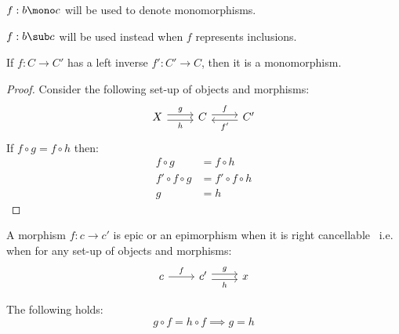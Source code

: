 \begin{remark}
  $f:b\mono c$ will be used to denote monomorphisms.
\end{remark}

\begin{remark}
  $f:b\sub c$ will be used instead when $f$ represents inclusions.
\end{remark}

\begin{theorem}\label{thm:left_inverse_implies_mono}

  If $f:C\to C'$ has a left inverse $f':C'\to C$, then it is a monomorphism.

  \begin{proof}
    Consider the following set-up of objects and morphisms:
    \[
      \begin{tikzcd}[ampersand replacement=\&]
        X \& C \& {C'}
        \arrow["f", shift left=1, from=1-2, to=1-3]
        \arrow["g", shift left=1, from=1-1, to=1-2]
        \arrow["h"', shift right=1, from=1-1, to=1-2]
        \arrow["{f'}", shift left=1, from=1-3, to=1-2]
      \end{tikzcd}
    \]
    If $f\circ g = f\circ h$ then:
    \[
      \begin{aligned}
        f\circ g &= f\circ h\\
        f'\circ f \circ g &= f'\circ f\circ h\\
        g &= h
      \end{aligned}
    \]
  \end{proof}
  \vspace{-\baselineskip}
\end{theorem}

\begin{definition}
  A morphism $f:c\to c'$ is epic or an epimorphism when it is right
  cancellable~\parencite[p.~19]{lane:working_mathematician} i.e. when for any set-up of
  objects and morphisms:
  \[\begin{tikzcd}[ampersand replacement=\&]
    c \& {c'} \& x
    \arrow["h"', shift right=1, from=1-2, to=1-3]
    \arrow["f", from=1-1, to=1-2]
    \arrow["g", shift left=1, from=1-2, to=1-3]
  \end{tikzcd}\]

  The following holds:
  \[g \circ f = h \circ f \implies g = h\]
\end{definition}

